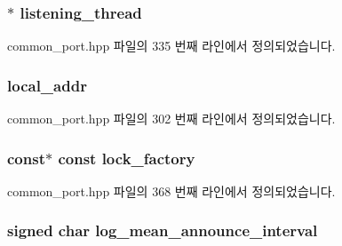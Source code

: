 \subsubsection[{\texorpdfstring{listening\+\_\+thread}{listening_thread}}]{$\ast$ listening\+\_\+thread\hspace{0.3cm}{\ttfamily [private]}}\hypertarget{class_common_port_a8d14866e935b3dd25fd2bc6593f41ca5}{}\label{class_common_port_a8d14866e935b3dd25fd2bc6593f41ca5}


common\+\_\+port.\+hpp 파일의 335 번째 라인에서 정의되었습니다.

\subsubsection[{\texorpdfstring{local\+\_\+addr}{local_addr}}]{ local\+\_\+addr\hspace{0.3cm}{\ttfamily [private]}}\hypertarget{class_common_port_af3d1546f688fbb9cec0317d152cab1da}{}\label{class_common_port_af3d1546f688fbb9cec0317d152cab1da}


common\+\_\+port.\+hpp 파일의 302 번째 라인에서 정의되었습니다.

\subsubsection[{\texorpdfstring{lock\+\_\+factory}{lock_factory}}]{ const$\ast$ const lock\+\_\+factory\hspace{0.3cm}{\ttfamily [protected]}}\hypertarget{class_common_port_a79c67e28bcaacaa0f11c04682d085b36}{}\label{class_common_port_a79c67e28bcaacaa0f11c04682d085b36}


common\+\_\+port.\+hpp 파일의 368 번째 라인에서 정의되었습니다.

\subsubsection[{\texorpdfstring{log\+\_\+mean\+\_\+announce\+\_\+interval}{log_mean_announce_interval}}]{\setlength{\rightskip}{0pt plus 5cm}signed char log\+\_\+mean\+\_\+announce\+\_\+interval\hspace{0.3cm}{\ttfamily [private]}}\hypertarget{class_common_port_a0a7e8ccfc7b9e1ee20c3e3f5ab15ed86}{}\label{class_common_port_a0a7e8ccfc7b9e1ee20c3e3f5ab15ed86}


